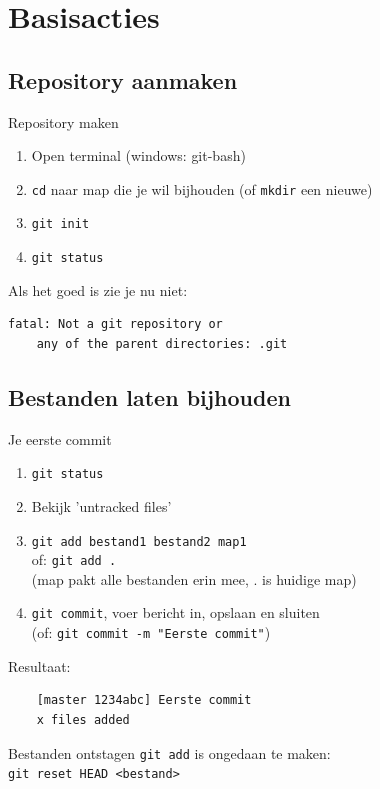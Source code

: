 \section{Basisacties}

\subsection{Repository aanmaken}
\begin{frame}[fragile]{Repository maken}
	\begin{enumerate}
		\item Open terminal (windows: \alert{git-bash})
		\item \texttt{cd} naar map die je wil bijhouden
			(of \texttt{mkdir} een nieuwe)
		\item \texttt{git init}
		\item \texttt{git status}
	\end{enumerate}
	Als het goed is zie je nu \alert{niet}:
	\begin{verbatim}
fatal: Not a git repository or 
	any of the parent directories: .git
	\end{verbatim}
\end{frame}

\subsection{Bestanden laten bijhouden}
\begin{frame}[fragile]{Je eerste commit}
	\begin{enumerate}
		\item \texttt{git status}
		\item Bekijk 'untracked files'
		\item \texttt{git add bestand1 bestand2 map1}\\ of:
			\texttt{git add .}\\
			(map pakt alle bestanden erin mee, . is huidige map)
		\item \texttt{git commit}, voer bericht in, opslaan en sluiten\\
			(of: \texttt{git commit -m "Eerste commit"})
	\end{enumerate}
	Resultaat: 
	\begin{verbatim}
	[master 1234abc] Eerste commit
	x files added
	\end{verbatim}
\end{frame}

\begin{frame}{Bestanden ontstagen}
	\texttt{git add} is ongedaan te maken:\\
	\texttt{git reset HEAD <bestand>}
\end{frame}

